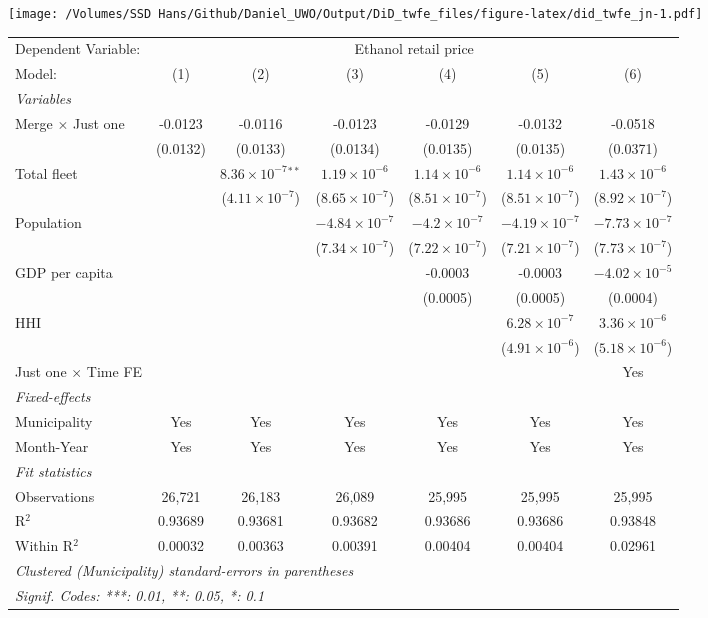 \documentclass[
]{article}
\begin{document}
\texttt{[image: /Volumes/SSD Hans/Github/Daniel\_UWO/Output/DiD\_twfe\_files/figure-latex/did\_twfe\_jn-1.pdf]}

\begin{tabular}{lcccccc}
\tabularnewline\midrule\midrule
Dependent Variable:&\multicolumn{6}{c}{Ethanol retail price}\\
Model:&(1) & (2) & (3) & (4) & (5) & (6)\\
\midrule \emph{Variables}&   &   &   &   &   &  \\
Merge $\times $ Just one & -0.0123 & -0.0116 & -0.0123 & -0.0129 & -0.0132 & -0.0518\\
  &(0.0132) & (0.0133) & (0.0134) & (0.0135) & (0.0135) & (0.0371)\\
Total fleet &    & $8.36\times 10^{-7}$$^{**}$ & $1.19\times 10^{-6}$ & $1.14\times 10^{-6}$ & $1.14\times 10^{-6}$ & $1.43\times 10^{-6}$\\
  &   & ($4.11\times 10^{-7}$) & ($8.65\times 10^{-7}$) & ($8.51\times 10^{-7}$) & ($8.51\times 10^{-7}$) & ($8.92\times 10^{-7}$)\\
Population &    &    & $-4.84\times 10^{-7}$ & $-4.2\times 10^{-7}$ & $-4.19\times 10^{-7}$ & $-7.73\times 10^{-7}$\\
  &   &    & ($7.34\times 10^{-7}$) & ($7.22\times 10^{-7}$) & ($7.21\times 10^{-7}$) & ($7.73\times 10^{-7}$)\\
GDP per capita &    &    &    & -0.0003 & -0.0003 & $-4.02\times 10^{-5}$\\
  &   &    &    & (0.0005) & (0.0005) & (0.0004)\\
HHI &    &    &    &    & $6.28\times 10^{-7}$ & $3.36\times 10^{-6}$\\
  &   &    &    &    & ($4.91\times 10^{-6}$) & ($5.18\times 10^{-6}$)\\
Just one $\times$ Time FE &  &  &  &  &  & Yes\\
\midrule \emph{Fixed-effects}&   &   &   &   &   &  \\
Municipality & Yes & Yes & Yes & Yes & Yes & Yes\\
Month-Year & Yes & Yes & Yes & Yes & Yes & Yes\\
\midrule \emph{Fit statistics}&  & & & & & \\
Observations & 26,721&26,183&26,089&25,995&25,995&25,995\\
R$^2$ & 0.93689&0.93681&0.93682&0.93686&0.93686&0.93848\\
Within R$^2$ & 0.00032&0.00363&0.00391&0.00404&0.00404&0.02961\\
\midrule\midrule\multicolumn{7}{l}{\emph{Clustered (Municipality) standard-errors in parentheses}}\\
\multicolumn{7}{l}{\emph{Signif. Codes: ***: 0.01, **: 0.05, *: 0.1}}\\
\end{tabular}
\end{document}
